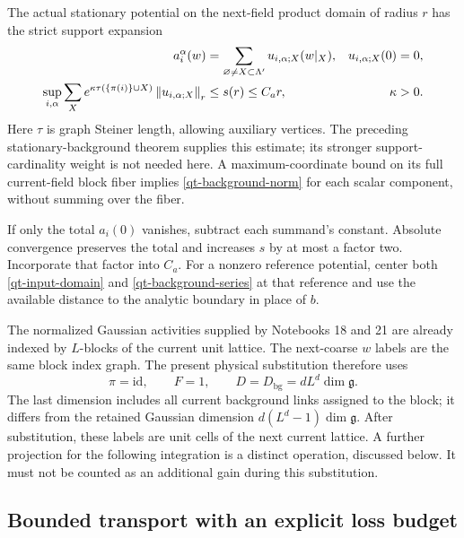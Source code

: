The actual stationary potential on the next-field product domain of
radius $r$ has the strict support expansion
\begin{align}
 a_i^\alpha(w)&=\sum_{\varnothing\ne X\subset\Lambda'}
                   u_{i,\alpha;X}(w|_X),
 &u_{i,\alpha;X}(0)&=0,                                  \label{qt-background-series}\\
 \sup_{i,\alpha}\sum_X
 e^{\kappa\tau(\{\pi(i)\}\cup X)}
       \left\|u_{i,\alpha;X}\right\|_r&\le s(r)\le C_a r,
 &\kappa&>0.                                             \label{qt-background-norm}
\end{align}
Here $\tau$ is graph Steiner length, allowing auxiliary vertices.
The preceding stationary-background theorem supplies this estimate;
its stronger support-cardinality weight is not needed here. A
maximum-coordinate bound on its full current-field block fiber
implies \eqref{qt-background-norm} for each scalar component, without
summing over the fiber.

If only the total $a_i(0)$ vanishes, subtract each summand's constant.
Absolute convergence preserves the total and increases $s$ by at most
a factor two. Incorporate that factor into $C_a$. For a nonzero
reference potential, center both \eqref{qt-input-domain} and
\eqref{qt-background-series} at that reference and use the available
distance to the analytic boundary in place of $b$.

\begin{remark}\label{qt-indexing}
The normalized Gaussian activities supplied by Notebooks 18 and 21
are already indexed by $L$-blocks of the current unit lattice. The
next-coarse $w$ labels are the same block index graph. The present
physical substitution therefore uses
\[
 \pi=\mathrm{id},\qquad F=1,\qquad
 D=D_{\mathrm{bg}}=dL^d\dim\mathfrak g.
\]
The last dimension includes all current background links assigned to
the block; it differs from the retained Gaussian dimension
$d(L^d-1)\dim\mathfrak g$. After substitution, these labels are unit
cells of the next current lattice. A further projection for the
following integration is a distinct operation, discussed below.
It must not be counted as an additional gain during this substitution.
\end{remark}

\subsection{Bounded transport with an explicit loss budget}

